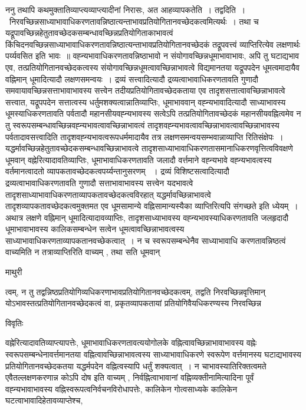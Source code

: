 \documentclass[10pt, openany]{book}
\begin{document}
{ननु तथापि कथमुक्तातिव्याप्त्यव्याप्त्यादीनां निरासः, अत आह\textendash व्यापकतेति~। {\qt तद्वदिति~।}~निरवच्छिन्नसाध्याभावाधिकरणतावन्निष्ठात्यन्ताभावप्रतियोगितानवच्छेदकत्वमित्यर्थः~। तथा च यद्रूपावच्छिन्नहेतुतावच्छेदकसम्बन्धावच्छिन्नप्रतियोगिताकाभावत्वं
किंचिदनवच्छिन्नसाध्याभावाधिकरणतावन्निष्ठात्यन्ताभावप्रतियोगितानवच्छेदकं तद्रूपवत्त्वं व्याप्तिरित्येव लक्षणार्थः पर्य्यवसित इति भावः~॥ वह्न्यभावाधिकरणतावन्निष्ठाभावो न संयोगावच्छिन्नधूमाभावाभावः, अपि तु घटाद्यभाव एव, तत्प्रतियोगितानवच्छेदकत्वस्य संयोगावच्छिन्नधूमत्वावच्छिन्नाभावत्वे विद्यमानतया यद्रूपपदेन धूमत्वमादायैव वह्निमान् धूमादित्यादौ लक्षणसमन्वयः~। द्रव्यं सत्त्वादित्यादौ द्रव्यत्वाभावाधिकरणतावति गुणादौ समवायावच्छिन्नसत्ताभावाभावस्य सत्त्वेन तदीयप्रतियोगितावच्छेदकताया एव तादृशसत्तात्वावच्छिन्नाभावत्वे सत्त्वात, यद्रूपपदेन सत्तात्वस्य धर्तुमशक्यत्वान्नातिव्याप्तिः, धूमाभाववान् वह्न्यभावादित्यादौ साध्याभावस्य धूमस्याधिकरणतावति पर्वतादौ महानसीयवह्न्यभावस्य सत्वेऽपि तत्प्रतियोगितावच्छेदकं महानसीयवह्नित्वमेव न तु स्वरूपसम्बन्धावच्छिन्नवह्न्यभावत्वावच्छिन्नाभावत्वं तादृशवह्न्यभावत्वावच्छिन्नाभावत्वावच्छिन्नाभावस्य पर्वतादावसत्त्वादिति तादृशवह्न्यभावत्वरूपधर्ममादायैव तत्र लक्षणसमन्वयसम्भवान्नाव्याप्ति रितिसंक्षेपः~। यद्धर्मावच्छिन्नहेतुतावच्छेदकसम्बन्धावच्छिन्नाभावत्वे तादृशसाध्याभावाधिकरणतासमानाधिकरणवृत्तित्वविवक्षणे धूमवान् वह्नेरित्यादावतिव्याप्तिः, धूमाभावाधिकरणतावति जलादौ वर्त्तमाने वह्न्यभावे वह्न्यभावत्वस्य वर्तमानत्वादतो व्यापकतावच्छेदकत्वपर्य्यन्तानुसरणम् ~। द्रव्यं विशिष्टसत्वादित्यादौ द्रव्यत्वाभावाधिकरणतावति गुणादौ सत्ताभावाभावस्य सत्त्वेन यदभावत्वे तादृशसाध्याभावाधिकरणताव्यापकतावच्छेदकत्वविरहात् यद्धर्मावच्छिन्नाभावत्वे तादृशव्यापकतावच्छेदकत्वमुक्तमत एव धूमसामान्ये वह्निसामान्यस्यैका व्याप्तिरित्यपि संगच्छते इति ध्येयम्~। अथात्र लक्षणे वह्निमान् धूमादित्यादावव्याप्तिः, तादृशसाध्याभावस्य वह्न्यभावस्याधिकरणतावति जलहृदादौ धूमाभावाभावस्य कालिकसम्बन्धेन सत्वेन धूमत्वावच्छिन्नाभावत्वस्य साध्याभावाधिकरणताव्यापकतानवच्छेकत्वात्~। न च स्वरूपसम्बन्धेनैव साध्याभावाधि
करणतावन्निष्ठत्वं वाच्यमिति न तत्राव्याप्तिरिति वाच्यम् , तथा सति धूमवान्
\newpage
 \begin{center}  माथुरी  \end{center}
{\la त्वम्, न तु तद्वन्निष्ठप्रतियोगिव्यधिकरणाभावप्रतियोगितानवच्छेदकत्वम्, तद्वति निरवच्छिन्नवृत्तिमान् योऽभावस्तत्प्रतियोगितानवच्छेदकत्वं वा, प्रकृतव्यापकतायां प्रतियोगिवैयधिकरण्यस्य निरवच्छिन्न}
\begin{center}     विवृतिः \end{center}
वह्नेरित्यादावतिव्याप्त्यापत्तेः, धूमाभावाधिकरणतावत्ययोगोलके वह्नित्वावच्छिन्नाभावाभावस्य वह्नेः स्वरूपसम्बन्धेनावर्त्तमानतया वह्नित्वावच्छिन्नाभावत्वस्य साध्याभावाधिकरणे स्वरूपेण वर्त्तमानस्य घटाद्यभावस्य प्रतियोगितानवच्छेदकतया यद्धर्मपदेन वह्नित्वस्यापि धर्तुं शक्यत्वात्~। न चाभावस्यातिरिक्तत्वमते एवैतल्लक्षणकरणान्न कोऽपि दोष इति वाच्यम् , निर्वह्नित्वाभावानां वह्निव्यक्तीनामित्यादिना पूर्वं वह्न्यभावाभावस्य वह्निस्वरूपत्वनिर्वचनविरोधापत्तेः, कालिकेन गोत्वसाध्यके कालिकेन घटत्वाभावादिहेतावव्याप्तेश्च,
}
\end{document}
